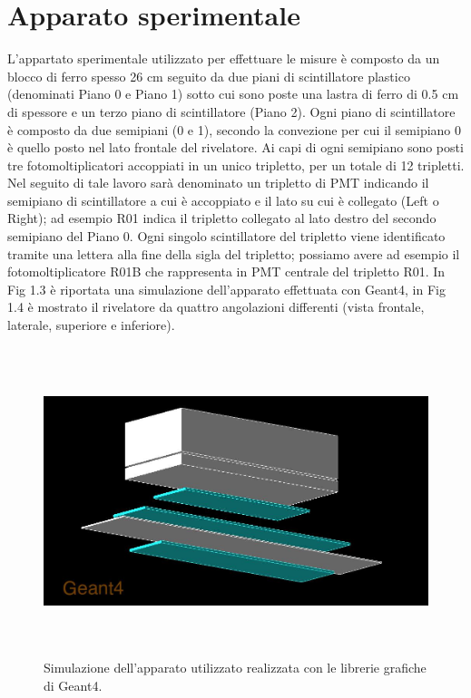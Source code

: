 \documentclass{standalone}
\begin{document}
\section{Apparato sperimentale}
L'appartato sperimentale utilizzato per effettuare le misure \`e composto da un blocco di ferro spesso 26 cm seguito da due piani di scintillatore plastico (denominati Piano 0 e Piano 1) sotto cui sono poste una lastra di ferro di 0.5 cm di spessore e un terzo piano di scintillatore (Piano 2).
Ogni piano di scintillatore \`e composto da due semipiani (0 e 1), secondo la convezione per cui il semipiano 0 \`e quello posto nel lato frontale del rivelatore. Ai capi di ogni semipiano sono posti tre fotomoltiplicatori accoppiati in un unico tripletto, per un totale di 12 tripletti. Nel seguito di tale lavoro sar\`a denominato un tripletto di PMT indicando il semipiano di scintillatore a cui \`e accoppiato e il lato su cui \`e collegato (Left o Right); ad esempio R01 indica il tripletto collegato al lato destro del secondo semipiano del Piano 0. Ogni singolo scintillatore del tripletto viene identificato tramite una lettera alla fine della sigla del tripletto; possiamo avere ad esempio il fotomoltiplicatore R01B che rappresenta in PMT centrale del tripletto R01.
In Fig 1.3 \`e riportata una simulazione dell'apparato effettuata con Geant4, in Fig 1.4 \`e mostrato il rivelatore da quattro angolazioni differenti (vista frontale, laterale, superiore e inferiore).

\begin{figure}[H]
	\centering
  \includegraphics[width=14cm, height=9cm]{images/general.jpg}
  \caption{Simulazione dell'apparato utilizzato realizzata con le librerie grafiche di Geant4.}
\end{figure}
\end{document}
